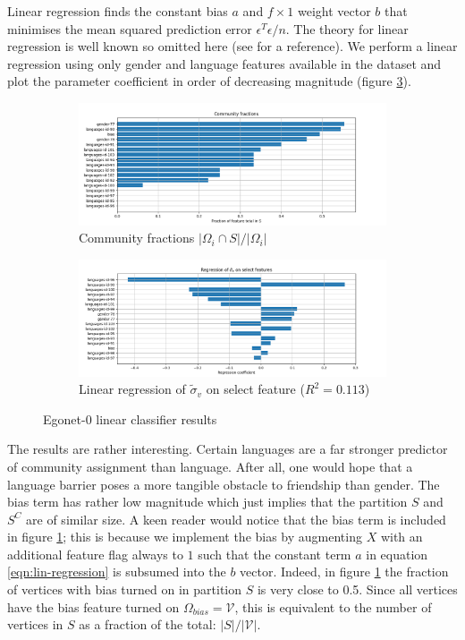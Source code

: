 \documentclass[]{article}
\newcommand{\Vcal}{\mathcal{V}}
\begin{document}
Linear regression finds the constant bias $a$ and $f \times 1$ weight vector $b$ that minimises the mean squared prediction error $\epsilon^T \epsilon / n$. The theory for linear regression is well known so omitted here (see \cite{yale-linear-regression} for a reference). We perform a linear regression using only gender and language features available in the dataset and plot the parameter coefficient in order of decreasing magnitude (figure \ref{fig:abp-output-lin-regression}).
%
\begin{figure}[!h]
	\centering
	\begin{subfigure}{0.6\linewidth}
		\includegraphics[width=\linewidth]{ego-0-abp-community-fractions.png}
		\caption{Community fractions $|\Omega_i \cap S| / |\Omega_i|$}
		\label{fig:abp-output-community-fractions}
	\end{subfigure}
	\begin{subfigure}{0.6\linewidth}
		\includegraphics[width=\linewidth]{ego-0-abp-lin-regression.png}
		\caption{Linear regression of $\tilde{\sigma}_v$ on select feature ($R^2 = 0.113$)}
		\label{fig:abp-output-lin-regression}
	\end{subfigure}
	\caption{Egonet-0 linear classifier results}
\end{figure}

The results are rather interesting. Certain languages are a far stronger predictor of community assignment than language. After all, one would hope that a language barrier poses a more tangible obstacle to friendship than gender. The bias term has rather low magnitude which just implies that the partition $S$ and $S^C$ are of similar size. A keen reader would notice that the bias term is included in figure \ref{fig:abp-output-community-fractions}; this is because we implement the bias by augmenting $X$ with an additional feature flag always to $1$ such that the constant term $a$ in equation \ref{eqn:lin-regression} is subsumed into the $b$ vector. Indeed, in figure \ref{fig:abp-output-community-fractions} the fraction of vertices with bias turned on in partition $S$ is very close to 0.5. Since all vertices have the bias feature turned on $\Omega_{bias} = \Vcal$, this is equivalent to the number of vertices in $S$ as a fraction of the total: $|S| / |\Vcal|$.
\end{document}
